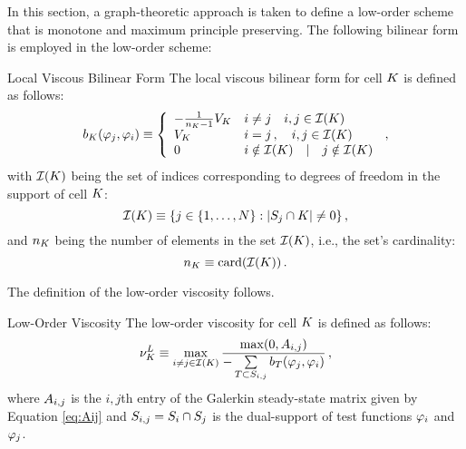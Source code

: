 In this section, a graph-theoretic approach is taken to define a low-order
scheme that is monotone and maximum principle preserving. The following
bilinear form is employed in the low-order scheme:
\begin{definition}{Local Viscous Bilinear Form}
   The local viscous bilinear form for cell $K$ is defined as follows:
   \begin{equation}\label{eq:bilinearform}
     \localviscbilinearform{\cell}{j}{i} \equiv \left\{\begin{array}{l l}
       -\frac{1}{\cardinality - 1}\cellvolume & i\ne j
       \quad i,j\in \indicescell \\
       \cellvolume & i = j \eqc \quad i,j\in \indicescell \\
       0           & i\notin\indicescell \quad | \quad j\notin\indicescell
     \end{array}\right. \eqc
   \end{equation}
   with $\indicescell$ being the set of indices corresponding to degrees of
   freedom in the support of cell $K$:
   \begin{equation}
     \indicescell \equiv \{j\in\{1,\ldots,N\}: |\support_j\cap \cell|\ne 0\}
     \eqc
   \end{equation}
   and $\cardinality$ being the number of elements in the set $\indicescell$,
   i.e., the set's cardinality:
   \begin{equation}
     \cardinality \equiv \textup{card}(\indicescell) \eqp
   \end{equation} 
\end{definition}
The definition of the low-order viscosity follows.
\begin{definition}{Low-Order Viscosity}
   The low-order viscosity for cell $K$ is defined as follows:
   \begin{equation}
     \lowordercellviscosity \equiv \max\limits_{i\ne j\in \indicescell}
     \frac{\max(0,\ssmatrixletter\ij)}
     {-\sum\limits_{T\subset\support\ij} \localviscbilinearform{T}{j}{i}}
     \eqc
   \end{equation}
   where $A_{i,j}$ is the $i,j$th entry of the Galerkin
   steady-state matrix given by Equation \eqref{eq:Aij} and
   $S_{i,j}=S_i\cap S_j$ is the dual-support of test
   functions $\varphi_i$ and $\varphi_j$.
\end{definition}
